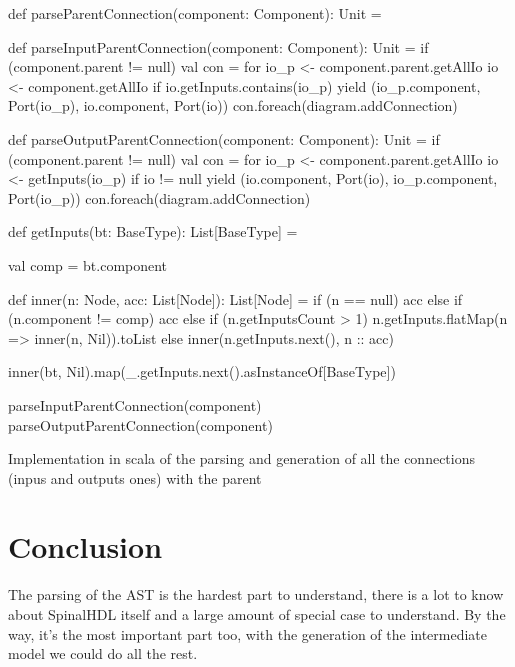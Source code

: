 \begin{listing}[H]
  \centering
  \begin{scalacode}
  def parseParentConnection(component: Component): Unit = {

    def parseInputParentConnection(component: Component): Unit = {
      if (component.parent != null) {
        val con = for {
          io_p <- component.parent.getAllIo
          io <- component.getAllIo
          if io.getInputs.contains(io_p)
        } yield (io_p.component, Port(io_p), io.component, Port(io))
        con.foreach(diagram.addConnection)
      }
    }

    def parseOutputParentConnection(component: Component): Unit = {
      if (component.parent != null) {
        val con = for {
          io_p <- component.parent.getAllIo
          io <- getInputs(io_p)
          if io != null
        } yield (io.component, Port(io), io_p.component, Port(io_p))
        con.foreach(diagram.addConnection)
      }
    }

    def getInputs(bt: BaseType): List[BaseType] = {
      val comp = bt.component

      def inner(n: Node, acc: List[Node]): List[Node] = {
        if (n == null) acc
        else if (n.component != comp) {
          acc
        }
        else if (n.getInputsCount > 1) {
          n.getInputs.flatMap(n => inner(n, Nil)).toList
        }
        else {
          inner(n.getInputs.next(), n :: acc)
        }
      }

      inner(bt, Nil).map(_.getInputs.next().asInstanceOf[BaseType])
  }

    parseInputParentConnection(component)
    parseOutputParentConnection(component)
  }
\end{scalacode}
  \caption[Parsing and generation of the connections with the
  parent]{Implementation in scala of the parsing and generation of all the
    connections (inpus and outputs ones) with the parent}
  \label{lst:parse-parent-connection}
\end{listing}

\section{Conclusion}
\label{sec:ast-parsing-conclusion}

The parsing of the AST is the hardest part to understand, there is a lot to know
about SpinalHDL itself and a large amount of special case to understand. By the
way, it's the most important part too, with the generation of the
intermediate model we could do all the rest.